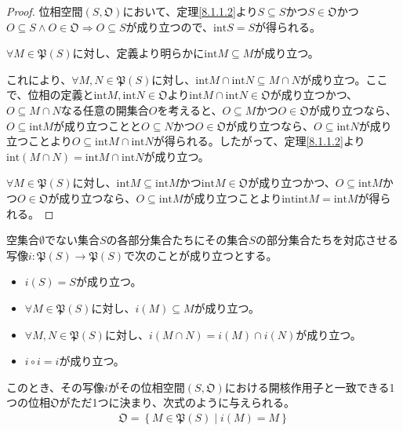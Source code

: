 \documentclass[dvipdfmx]{jsarticle}
\begin{document}
\begin{proof} 位相空間$\left( S,\mathfrak{O} \right)$において、定理\ref{8.1.1.2}より$S \subseteq S$かつ$S \in \mathfrak{O}$かつ$O \subseteq S \land O \in \mathfrak{O} \Rightarrow O \subseteq S$が成り立つので、${\mathrm{int}}S = S$が得られる。\par
$\forall M \in \mathfrak{P}(S)$に対し、定義より明らかに${\mathrm{int}}M \subseteq M$が成り立つ。\par
これにより、$\forall M,N \in \mathfrak{P}(S)$に対し、${\mathrm{int}}M \cap {\mathrm{int}}N \subseteq M \cap N$が成り立つ。ここで、位相の定義と${\mathrm{int}}M,{\mathrm{int}}N\in \mathfrak{O}$より${\mathrm{int}}M \cap {\mathrm{int}}N\in \mathfrak{O}$が成り立つかつ、$O \subseteq M \cap N$なる任意の開集合$O$を考えると、$O \subseteq M$かつ$O \in \mathfrak{O}$が成り立つなら、$O \subseteq {\mathrm{int}}M$が成り立つことと$O \subseteq N$かつ$O \in \mathfrak{O}$が成り立つなら、$O \subseteq {\mathrm{int}}N$が成り立つことより$O \subseteq {\mathrm{int}}M \cap {\mathrm{int}}N$が得られる。したがって、定理\ref{8.1.1.2}より${\mathrm{int}}(M \cap N) = {\mathrm{int}}M \cap {\mathrm{int}}N$が成り立つ。\par
$\forall M\in \mathfrak{P}(S)$に対し、${\mathrm{int}}M \subseteq {\mathrm{int}}M$かつ${\mathrm{int}}M\in \mathfrak{O}$が成り立つかつ、$O \subseteq {\mathrm{int}}M$かつ$O \in \mathfrak{O}$が成り立つなら、$O \subseteq {\mathrm{int}}M$が成り立つことより${\mathrm{int}}{{\mathrm{int}}M} = {\mathrm{int}}M$が得られる。
\end{proof}
\begin{thm}\label{8.1.1.12}
空集合$\emptyset$でない集合$S$の各部分集合たちにその集合$S$の部分集合たちを対応させる写像$i:\mathfrak{P}(S)\mathfrak{\rightarrow P}(S)$で次のことが成り立つとする。
\begin{itemize}
\item
  $i(S) = S$が成り立つ。
\item
  $\forall M\in \mathfrak{P}(S)$に対し、$i(M) \subseteq M$が成り立つ。
\item
  $\forall M,N\in \mathfrak{P}(S)$に対し、$i(M \cap N) = i(M) \cap i(N)$が成り立つ。
\item
  $i \circ i = i$が成り立つ。
\end{itemize}
このとき、その写像$i$がその位相空間$\left( S,\mathfrak{O} \right)$における開核作用子と一致できる1つの位相$\mathfrak{O}$がただ1つに決まり、次式のように与えられる。
\begin{align*}
\mathfrak{O}=\left\{ M \in \mathfrak{P}(S) \middle| i(M) = M \right\}
\end{align*}
\end{thm}
\end{document}
